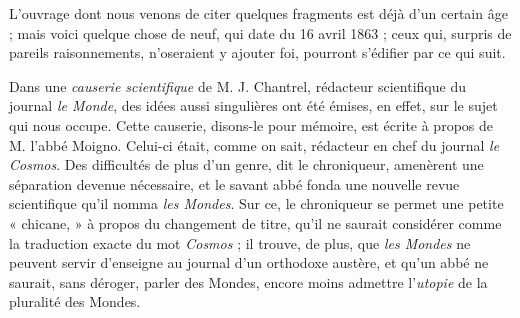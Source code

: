 \documentclass[a4paper, 11pt, oneside]{article}
\begin{document}
L'ouvrage dont nous venons de citer quelques fragments est déjà d'un certain âge ; mais voici quelque chose de neuf, qui date du 16 avril 1863 ; ceux qui, surpris de pareils raisonnements, n'oseraient y ajouter foi, pourront s'édifier par ce qui suit.

Dans une \emph{causerie scientifique} de M. J. Chantrel, rédacteur scientifique du journal \emph{le Monde}, des idées aussi singulières ont été émises, en effet, sur le sujet qui nous occupe. Cette causerie, disons-le pour mémoire, est écrite à propos de M. l'abbé Moigno. Celui-ci était, comme on sait, rédacteur en chef du journal \emph{le Cosmos}. Des difficultés de plus d'un genre, dit le chroniqueur, amenèrent une séparation devenue nécessaire, et le savant abbé fonda une nouvelle revue scientifique qu'il nomma \emph{les Mondes}. Sur ce, le chroniqueur se permet une petite « chicane, » à propos du changement de titre, qu'il ne saurait considérer comme la traduction exacte du mot \emph{Cosmos} ; il trouve, de plus, que \emph{les Mondes} ne peuvent servir d'enseigne au journal d'un orthodoxe austère, et qu'un abbé ne saurait, sans déroger, parler des Mondes, encore moins admettre l'\emph{utopie} de la pluralité des Mondes.
\end{document}
